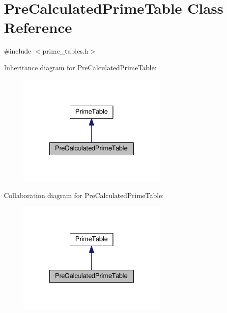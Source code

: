 \hypertarget{classPreCalculatedPrimeTable}{}\section{Pre\+Calculated\+Prime\+Table Class Reference}
\label{classPreCalculatedPrimeTable}


{\ttfamily \#include $<$prime\+\_\+tables.\+h$>$}



Inheritance diagram for Pre\+Calculated\+Prime\+Table\+:
\nopagebreak
\begin{figure}[H]
\begin{center}
\leavevmode
\includegraphics[width=208pt]{classPreCalculatedPrimeTable__inherit__graph}
\end{center}
\end{figure}


Collaboration diagram for Pre\+Calculated\+Prime\+Table\+:
\nopagebreak
\begin{figure}[H]
\begin{center}
\leavevmode
\includegraphics[width=208pt]{classPreCalculatedPrimeTable__coll__graph}
\end{center}
\end{figure}
